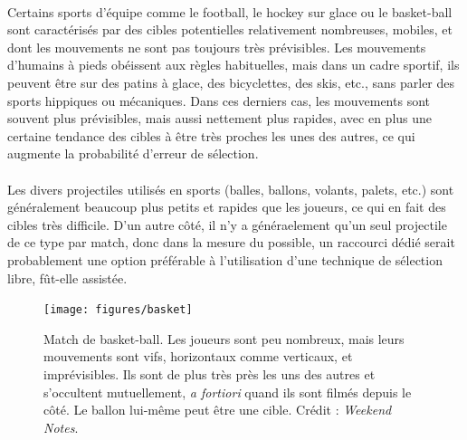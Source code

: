 	\paragraph{}
	Certains sports d'équipe comme le football, le hockey sur glace ou le basket-ball sont caractérisés par des cibles potentielles relativement nombreuses, mobiles, et dont les mouvements ne sont pas toujours très prévisibles. Les mouvements d'humains à pieds obéissent aux règles habituelles, mais dans un cadre sportif, ils peuvent être sur des patins à glace, des bicyclettes, des skis, etc., sans parler des sports hippiques ou mécaniques. Dans ces derniers cas, les mouvements sont souvent plus prévisibles, mais aussi nettement plus rapides, avec en plus une certaine tendance des cibles à être très proches les unes des autres, ce qui augmente la probabilité d'erreur de sélection.
	
	\paragraph{}
	Les divers projectiles utilisés en sports (balles, ballons, volants, palets, etc.) sont généralement beaucoup plus petits et rapides que les joueurs, ce qui en fait des cibles très difficile. D'un autre côté, il n'y a généraelement qu'un seul projectile de ce type par match, donc dans la mesure du possible, un raccourci dédié serait probablement une option préférable à l'utilisation d'une technique de sélection libre, fût-elle assistée.
	
	\begin{figure}[ht]
		\centering
		\texttt{[image: figures/basket]}
		\caption{Match de basket-ball. Les joueurs sont peu nombreux, mais leurs mouvements sont vifs, horizontaux comme verticaux, et imprévisibles. Ils sont de plus très près les uns des autres et s'occultent mutuellement, \emph{a fortiori} quand ils sont filmés depuis le côté. Le ballon lui-même peut être une cible. Crédit : \emph{Weekend Notes}.}
		\label{fig:basketball}
	\end{figure}
	
